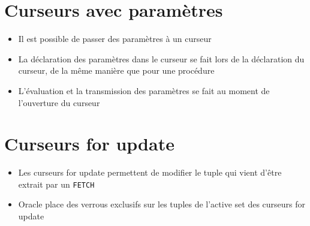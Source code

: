 \documentclass[10pt]{beamer}
\begin{document}
\begin{frame}{\secname}
    
\end{frame}



\section{Curseurs avec paramètres}
\begin{frame}{\secname}
    \begin{itemize}
        \item Il est possible de passer des paramètres à un curseur
        \item La déclaration des paramètres dans le curseur se fait lors de la déclaration du curseur, de la même manière que pour une procédure
        \item L'évaluation et la transmission des paramètres se fait au moment de l'ouverture du curseur
    \end{itemize}
\end{frame}

\begin{frame}{\secname}
    
\end{frame}

\begin{frame}[allowframebreaks]{\secname}
    
\end{frame}

\section{Curseurs for update}
\begin{frame}{\secname}
    \begin{itemize}
        \item Les curseurs for update permettent de modifier le tuple qui vient d'être extrait par un \lstinline[language=plsql]!FETCH!
        \item Oracle place des verrous exclusifs sur les tuples de l'active set des curseurs for update
    \end{itemize}
    
\end{frame}
%     
\end{document}

